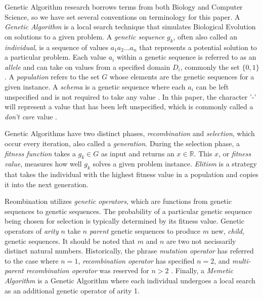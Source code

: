 Genetic Algorithm research borrows terms from both Biology and Computer Science, so we have set several conventions on terminology for this paper. A \emph{Genetic Algorithm} is a local search technique that simulates Biological Evolution on solutions to a given problem\cite{Russell10}. A \emph{genetic sequence} $g_k$, often also called an \emph{individual}, is a sequence of values $a_1 a_2\ldots a_n$ that represents a potential solution to a particular problem. Each value $a_i$ within a genetic sequence is referred to as an \emph{allele} and can take on values from a specified domain $D_i$, commonly the set $\{0,1\}$. A \emph{population} refers to the set $G$ whose elements are the genetic sequences for a given instance. A \emph{schema} is a genetic sequence where each $a_i$ can be left unspecified and is not required to take any value \cite{Russell10}. In this paper, the character '-' will represent a value that has been left unspecified, which is commonly called a \emph{don't care} value \cite{Holland75}.

Genetic Algorithms have two distinct phases, \emph{recombination} and \emph{selection}, which occur every iteration, also called a \emph{generation}. During the selection phase, a \emph{fitness function} takes a $g_k \in G$ as input and returns an $x \in \mathbb{R}$. This $x$, or \emph{fitness value}, measures how well $g_k$ solves a given problem instance. \emph{Elitism} is a strategy that takes the individual with the highest fitness value in a population and copies it into the next generation.

Reombination utilizes \emph{genetic operators}, which are functions from genetic sequences to genetic sequences. The probability of a particular genetic sequence being chosen for selection is typically determined by its fitness value. Genetic operators of \emph{arity} $n$ take $n$ \emph{parent} genetic sequences to produce $m$ new, \emph{child}, genetic sequences. It should be noted that $m$ and $n$ are two not necissarily distinct natural numbers.  Historically, the phrase \emph{mutation operator} has referred to the case where $n = 1$, \emph{recombination operator} has specified $n = 2$, and \emph{multi-parent recombination operator} was reserved for $n > 2$ \cite{Eiben94}. Finally, a \emph{Memetic Algorithm} is a Genetic Algorithm where each individual undergoes a local search as an additional genetic operator of arity 1.